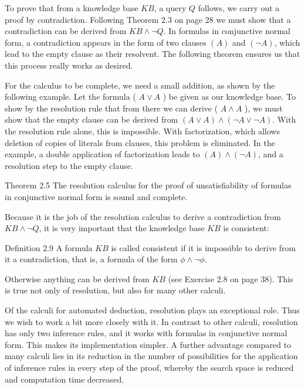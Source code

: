 \documentclass[10pt]{article}
\begin{document}
To prove that from a knowledge base $K B$, a query $Q$ follows, we carry out a proof by contradiction. Following Theorem 2.3 on page 28 we must show that a contradiction can be derived from $K B \wedge \neg Q$. In formulas in conjunctive normal form, a contradiction appears in the form of two clauses $(A)$ and $(\neg A)$, which lead to the empty clause as their resolvent. The following theorem ensures us that this process really works as desired.

For the calculus to be complete, we need a small addition, as shown by the following example. Let the formula ( $A \vee A$ ) be given as our knowledge base. To show by the resolution rule that from there we can derive ( $A \wedge A$ ), we must show that the empty clause can be derived from $(A \vee A) \wedge(\neg A \vee \neg A)$. With the resolution rule alone, this is impossible. With factorization, which allows deletion of copies of literals from clauses, this problem is eliminated. In the example, a double application of factorization leads to $(A) \wedge(\neg A)$, and a resolution step to the empty clause.

\begin{displayquote}
Theorem 2.5 The resolution calculus for the proof of unsatisfiability of formulas in conjunctive normal form is sound and complete.
\end{displayquote}

Because it is the job of the resolution calculus to derive a contradiction from $K B \wedge \neg Q$, it is very important that the knowledge base $K B$ is consistent:

Definition 2.9 A formula $K B$ is called consistent if it is impossible to derive from it a contradiction, that is, a formula of the form $\phi \wedge \neg \phi$.

Otherwise anything can be derived from $K B$ (see Exercise 2.8 on page 38). This is true not only of resolution, but also for many other calculi.

Of the calculi for automated deduction, resolution plays an exceptional role. Thus we wish to work a bit more closely with it. In contrast to other calculi, resolution has only two inference rules, and it works with formulas in conjunctive normal form. This makes its implementation simpler. A further advantage compared to many calculi lies in its reduction in the number of possibilities for the application of inference rules in every step of the proof, whereby the search space is reduced and computation time decreased.
\end{document}
